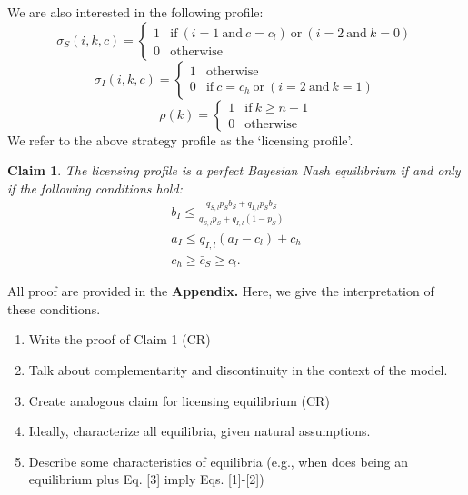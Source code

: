 \documentclass[11pt]{article}
\theoremstyle{plainCl1}
\newtheorem{Claim}{Claim}
\begin{document}
\noindent
We are also interested in the following profile:
\begin{equation}
\sigma_S(i,k,c) = \left\{
\begin{array}{ll}
1	&\text{if}~(i\!=\!1 ~\text{and}~ c\!=\!c_l)~\text{or}~(i\!=\!2~\text{and}~k\!=\!0)\\
0	&\text{otherwise}
\end{array}
\right.
\end{equation}
\begin{equation}
\sigma_I(i,k,c)= \left\{
\begin{array}{ll}
1	&\text{otherwise}\\
0	&\text{if}~ c\!=\!c_h~\text{or}~(i\!=\!2~\text{and}~k\!=\!1)
\end{array}
\right.
\end{equation}
\begin{equation}
\rho(k) = \left\{
\begin{array}{ll}
1	&\text{if}~k \ge n-1\\
0	&\text{otherwise}
\end{array}
\right.
\end{equation}
We refer to the above strategy profile as the `licensing profile'. 

\begin{Claim}
The licensing profile is a perfect Bayesian Nash equilibrium if and only if the following conditions hold:
\begin{equation}
\begin{array}{c}
\displaystyle b_I \le \frac{q_{S,l}p_Sb_S + q_{I,l}p_Sb_S}{q_{S,l}p_S + q_{I,l}(1-p_S)}\\[0.4cm]
\displaystyle a_I \le q_{I,l}(a_I-c_l)+c_h\\[0.4cm]
\displaystyle  c_h \ge \bar{c}_S \ge c_l. 
\end{array}
\end{equation}
\end{Claim}

\noindent
All proof are provided in the {\bf Appendix.} Here, we give the interpretation of these conditions. \\

\begin{enumerate}
\item Write the proof of Claim 1 (CR)
\item Talk about complementarity and discontinuity in the context of the model.
\item Create analogous claim for licensing equilibrium (CR)
\item Ideally, characterize all equilibria, given natural assumptions. 
\item Describe some characteristics of equilibria (e.g., when does being an equilibrium plus Eq. [3] imply Eqs. [1]-[2])
\end{enumerate}
\end{document}
